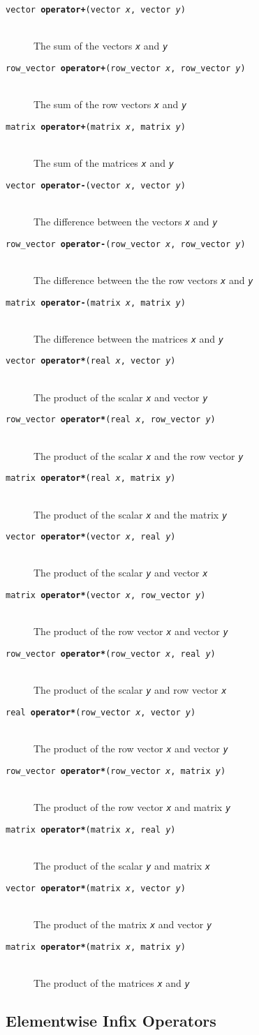 \documentclass[10pt]{report}
\newcommand{\fitem}[4]{\item[{\tt #1 {\bfseries #2}(#3)}]\mbox{ } \\[4pt] #4}
\newcommand{\farg}[1]{{\tt\slshape #1}}
\begin{document}
\begin{description}
%
\fitem{vector}{operator+}{vector \farg{x}, vector \farg{y}}{The sum of
the vectors \farg{x} and \farg{y}}
%
\fitem{row\_vector}{operator+}{row\_vector \farg{x}, row\_vector \farg{y}}{The sum of
the row vectors \farg{x} and \farg{y}}
%
\fitem{matrix}{operator+}{matrix \farg{x}, matrix \farg{y}}{The sum of
the matrices \farg{x} and \farg{y}}
%
\end{description}
\vspace*{-4pt}
\begin{description}
\fitem{vector}{operator-}{vector \farg{x}, vector \farg{y}}{The difference between
the vectors \farg{x} and \farg{y}}
%
\fitem{row\_vector}{operator-}{row\_vector \farg{x}, row\_vector \farg{y}}{The
  difference between the the row vectors \farg{x} and \farg{y}}
%
\fitem{matrix}{operator-}{matrix \farg{x}, matrix \farg{y}}{The difference between
  the matrices \farg{x} and \farg{y}}
%
\end{description}
\vspace*{-4pt}
\begin{description}
%
\fitem{vector}{operator*}{real \farg{x}, vector \farg{y}}{The product of
the scalar \farg{x} and vector \farg{y}}
%
\fitem{row\_vector}{operator*}{real \farg{x}, row\_vector \farg{y}}{The product of
the scalar \farg{x} and the row vector \farg{y}}
%
\fitem{matrix}{operator*}{real \farg{x}, matrix \farg{y}}{The product of
the scalar \farg{x} and the matrix \farg{y}}
%
%
\fitem{vector}{operator*}{vector \farg{x}, real \farg{y}}{The product of
the scalar \farg{y} and vector \farg{x}}
%
\fitem{matrix}{operator*}{vector \farg{x}, row\_vector \farg{y}}{The product
of the row vector \farg{x} and vector \farg{y}}
%
%
\fitem{row\_vector}{operator*}{row\_vector \farg{x}, real \farg{y}}{The product of
the scalar \farg{y} and row vector \farg{x}}
%
\fitem{real}{operator*}{row\_vector \farg{x}, vector \farg{y}}{The product
of the row vector \farg{x} and vector \farg{y}}
%
\fitem{row\_vector}{operator*}{row\_vector \farg{x}, matrix \farg{y}}{The product
of the row vector \farg{x} and matrix \farg{y}}
%
%
\fitem{matrix}{operator*}{matrix \farg{x}, real \farg{y}}{The product of
the scalar \farg{y} and matrix \farg{x}}
%
\fitem{vector}{operator*}{matrix \farg{x}, vector \farg{y}}{The
  product of the matrix \farg{x} and vector \farg{y}}
%
\fitem{matrix}{operator*}{matrix \farg{x}, matrix \farg{y}}{The product of 
  the matrices \farg{x} and \farg{y}}
%
\end{description}

\subsection{Elementwise Infix Operators}
\end{document}
